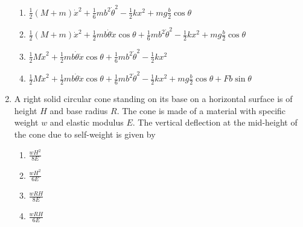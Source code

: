 \documentclass[journal,12pt,onecolumn]{IEEEtran}
\theoremstyle{remark}
\begin{document}
\begin{enumerate}
\begin{enumerate}
	\item $ \frac{1}{2}(M + m)\dot{x}^2 + \frac{1}{6}mb^2\dot{\theta}^2 - \frac{1}{2}kx^2 + mg \frac{b}{2}\cos\theta $\\
	\item $ \frac{1}{2}(M + m)\dot{x}^2 + \frac{1}{2}mb\dot{\theta}\dot{x} \cos \theta + \frac{1}{6}mb^2\dot{\theta}^2 - \frac{1}{2}kx^2 + mg \frac{b}{2}\cos\theta $\\
	\item $ \frac{1}{2}M\dot{x}^2 + \frac{1}{2}mb\dot{\theta}\dot{x} \cos \theta + \frac{1}{6}mb^2\dot{\theta}^2 - \frac{1}{2}kx^2 $\\
	\item $ \frac{1}{2}M\dot{x}^2 + \frac{1}{2}mb\dot{\theta}\dot{x} \cos \theta + \frac{1}{6}mb^2\dot{\theta}^2 - \frac{1}{2}kx^2 + mg \frac{b}{2} \cos \theta + Fb \sin \theta $
\end{enumerate}

	
\item A right solid circular cone standing on its base on a horizontal surface is of height $H$ and base radius $R$. The cone is made of a material with specific weight $w$ and elastic modulus $E$. The vertical deflection at the mid-height of the cone due to self-weight is given by
\begin{enumerate}
	\item $\frac{wH^{2}}{8E}$
	\item $\frac{wH^{2}}{6E}$
	\item $\frac{wRH}{8E}$
	\item $\frac{wRH}{6E}$
\end{enumerate}


\end{enumerate}
\end{document}
